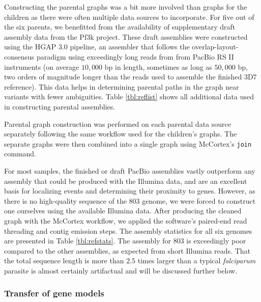 Constructing the parental graphs was a bit more involved than graphs for the children as there were often multiple data sources to incorporate.  For five out of the six parents, we benefitted from the availability of supplementary draft assembly data from the Pf3k project.  These draft assemblies were constructed using the HGAP $3.0$ pipeline\cite{Chin:2013iw}, an assembler that follows the overlap-layout-consensus paradigm\cite{Myers:1995vm} using exceedingly long reads from from PacBio RS II instruments (on average $10,000$ bp in length, sometimes as long as $50,000$ bp, two orders of magnitude longer than the reads used to assemble the finished 3D7 reference).  This data helps in determining parental paths in the graph near variants with fewer ambiguities.  Table \ref{tbl:reflist} shows all additional data used in constructing parental assemblies.

Parental graph construction was performed on each parental data source separately following the same workflow used for the children's graphs.  The separate graphs were then combined into a single graph using McCortex's \texttt{join} command.

For most samples, the finished or draft PacBio assemblies vastly outperform any assembly that could be produced with the Illumina data, and are an excellent basis for localizing events and determining their proximity to genes.  However, as there is no high-quality sequence of the $803$ genome, we were forced to construct one ourselves using the available Illumina data.  After producing the cleaned graph with the McCortex workflow, we applied the software's paired-end read threading and contig emission steps.  The assembly statistics for all six genomes are presented in Table \ref{tbl:refstats}.  The assembly for $803$ is exceedingly poor compared to the other assemblies, as expected from short Illumina reads.  That the total sequence length is more than $2.5$ times larger than a typical \textit{falciparum} parasite is almost certainly artifactual and will be discussed further below.

\subsubsection{Transfer of gene models}

